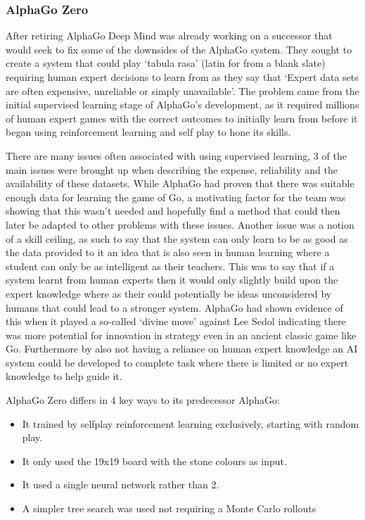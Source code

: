 \documentclass[a4paper]{article}
\begin{document}
\subsubsection{AlphaGo Zero}
After retiring AlphaGo Deep Mind was already working on a successor that would seek to fix some of the downsides of the AlphaGo system.
They sought to create a system that could play `tabula rasa' (latin for from a blank slate) requiring human expert decisions to learn from as they say that `Expert data sets are often expensive, unreliable or simply unavailable'\cite{alphaGoZero}.
The problem came from the initial supervised learning stage of AlphaGo's development, as it required millions of human expert games with the correct outcomes to initially learn from before it began using reinforcement learning and self play to hone its skills.
\par
There are many issues often associated with using supervised learning, 3 of the main issues were brought up when describing the expense, reliability and the availability of these datasets.
While AlphaGo had proven that there was suitable enough data for learning the game of Go, a motivating factor for the team was showing that this wasn't needed and hopefully find a method that could then later be adapted to other problems with these issues.
Another issue was a notion of a skill ceiling, as such to say that the system can only learn to be as good as the data provided to it an idea that is also seen in human learning where a student can only be as intelligent as their teachers.
This was to say that if a system learnt from human experts then it would only slightly build upon the expert knowledge where as their could potentially be ideas unconsidered by humans that could lead to a stronger system.
AlphaGo had shown evidence of this when it played a so-called `divine move' against Lee Sedol indicating there was more potential for innovation in strategy even in an ancient classic game like Go.
Furthermore by also not having a reliance on human expert knowledge an AI system could be developed to complete task where there is limited or no expert knowledge to help guide it.
\par
AlphaGo Zero differs in 4 key ways to its predecessor AlphaGo:
\begin{itemize}
    \item It trained by selfplay reinforcement learning exclusively, starting with random play.
    \item It only used the 19x19 board with the stone colours as input.
    \item It used a single neural network rather than 2.
    \item A simpler tree search was used not requiring a Monte Carlo rollouts
\end{itemize}
\end{document}
